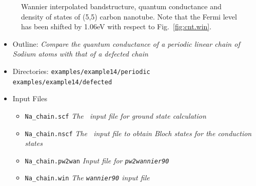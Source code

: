 \documentclass[a4paper,11pt,twoside]{article}
\begin{document}
\begin{figure}[h]
\begin{center}
\caption{Wannier interpolated bandstructure, quantum conductance and
density of states of (5,5) carbon nanotube. Note that the Fermi level has been shifted 
by 1.06eV with respect to Fig.~\ref{fig:cnt.win}.}
\label{fig:cnt.tran}
\end{center}
\end{figure}



\begin{itemize}
  \item{Outline: \it{Compare the quantum conductance of a periodic 
  	linear chain of Sodium atoms with that of a defected chain}}
  \item{\begin{tabbing}
  Directories: \= {\tt examples/example14/periodic}\\ 
    				 \> {\tt examples/example14/defected}
    		\end{tabbing}}
  \item{Input Files}
    \begin{itemize}
      \item{ {\tt Na\_chain.scf}  {\it The \pwscf\ input file for ground state
	  calculation}}
      \item{ {\tt Na\_chain.nscf}  {\it The \pwscf\ input file to obtain Bloch
	  states for the conduction states}} 
      \item{ {\tt Na\_chain.pw2wan}  {\it Input file for {\tt pw2wannier90}}}
      \item{ {\tt Na\_chain.win}  {\it The {\tt wannier90} input file}}
    \end{itemize}
\end{itemize}
\end{document}
